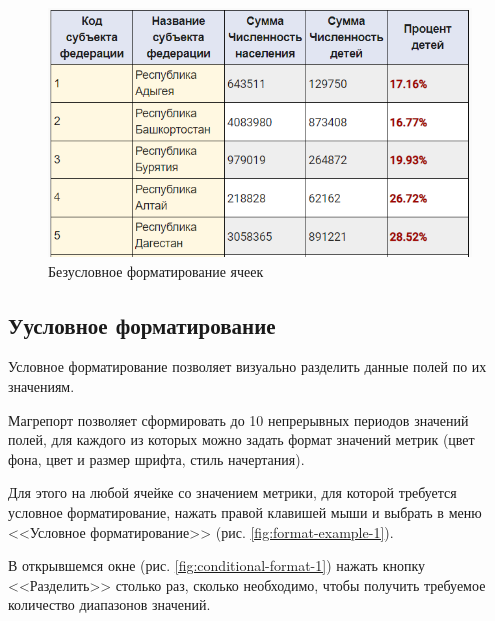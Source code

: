 \documentclass[../user-manual.tex]{subfiles}
\begin{document}
	\begin{figure}[h]
		\centering
		\includegraphics[width=\graphicswidth]{img/16-format-example.png}
		\caption{Безусловное форматирование ячеек}
		\label{fig:format-example-2}
	\end{figure}
	
	\subsection{Уусловное форматирование}

	Условное форматирование позволяет визуально разделить данные полей по их значениям.
	
	Магрепорт позволяет сформировать до 10 непрерывных периодов значений полей, для каждого из которых можно задать формат значений метрик (цвет фона, цвет и размер шрифта, стиль начертания).
	
	Для этого на любой ячейке со значением метрики, для которой требуется условное форматирование, нажать правой клавишей мыши и выбрать в меню <<Условное форматирование>> (рис. \ref{fig:format-example-1}).
	
	В открывшемся окне  (рис. \ref{fig:conditional-format-1}) нажать кнопку <<Разделить>> столько раз, сколько необходимо, чтобы получить требуемое количество диапазонов значений.
	
\end{document}
